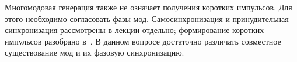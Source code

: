 Многомодовая генерация также не означает получения коротких импульсов. Для этого необходимо согласовать фазы мод. Самосинхронизация и принудительная синхронизация рассмотрены в лекции отдельно; формирование коротких импульсов разобрано в~. В данном вопросе достаточно различать совместное существование мод и их фазовую синхронизацию.
